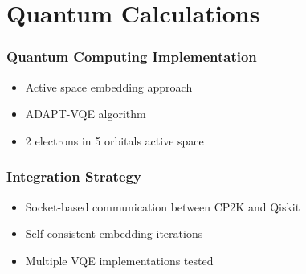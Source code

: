 \section{Quantum Calculations}

\begin{frame}
\frametitle{Quantum Computing Implementation}
\begin{itemize}
    \item Active space embedding approach
    \item ADAPT-VQE algorithm
    \item 2 electrons in 5 orbitals active space
\end{itemize}
\end{frame}

\begin{frame}
\frametitle{Integration Strategy}
\begin{itemize}
    \item Socket-based communication between CP2K and Qiskit
    \item Self-consistent embedding iterations
    \item Multiple VQE implementations tested
\end{itemize}
\end{frame} 